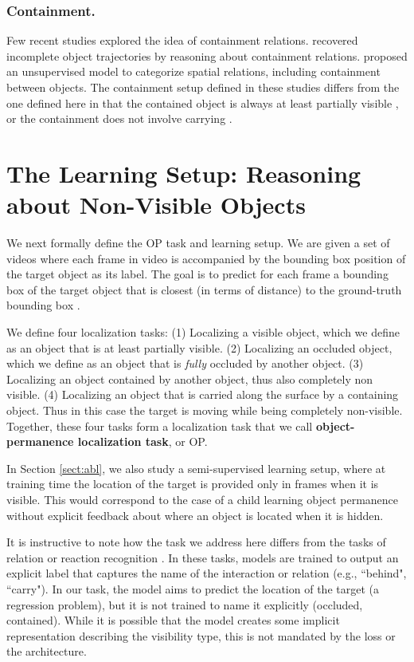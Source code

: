 \documentclass[]{llncs}
\newcommand{\secref}[1]{Section \ref{#1}}
\begin{document}
\subsubsection{Containment.} Few recent studies explored the idea of containment relations.
{\cite{liang2018tracking} recovered incomplete object trajectories by reasoning about containment relations. \cite{ullman2019model} proposed an unsupervised model to categorize spatial relations, including containment between objects. The containment setup defined in these studies differs from the one defined here in that the contained object is always at least partially visible \cite{ullman2019model}, or 
the containment does not involve carrying \cite{liang2018tracking,ullman2019model}.}

\section{The Learning Setup: Reasoning about Non-Visible Objects}
We next formally define the OP task and learning setup. 
We are given a set of videos  where each frame  in video  is accompanied by the bounding box position  of the target object as its label. The goal is to predict for each frame a bounding box  of the target object that is closest (in terms of   distance) to the ground-truth bounding box . 

We define four localization tasks: (1) Localizing a visible object, which we define as an object that is at least partially visible. (2) Localizing an occluded object, which we define as an object that is \textit{fully} occluded by another object. (3) Localizing an object contained by another object, thus also completely non visible. (4) Localizing an object that is carried along the surface by a containing object. Thus in this case the target is moving while being completely non-visible. Together, these four tasks form a  localization task that we call \textbf{object-permanence localization task}, or OP.

In \secref{sect:abl}, we also study a semi-supervised learning setup, where at training time the location  of the target is provided only in frames when it is visible. This would correspond to the case of a child learning object permanence without explicit feedback about where an object is located when it is hidden. 

It is instructive to note how the task we address here differs from the tasks of relation or reaction recognition \cite{krishna2017visual,lu2016visual,sadeghi2011recognition}.
In these tasks, models are trained to output an explicit label that captures the name of the interaction or relation (e.g., ``behind", ``carry"). In our task, the model aims to predict the location of the target (a regression problem), but it is not trained to name it explicitly (occluded, contained). While it is possible that the model creates some implicit representation describing the visibility type, this is not mandated by the loss or the architecture. 
\end{document}
